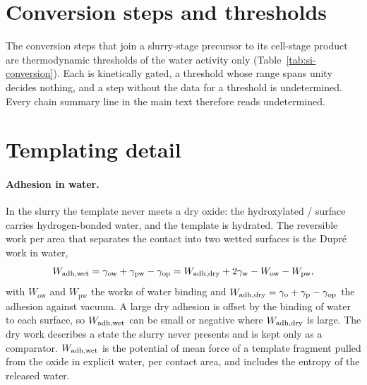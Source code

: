 \section{Conversion steps and thresholds}\label{si:conversion}
The conversion steps that join a slurry-stage precursor to its cell-stage product are thermodynamic thresholds of the water activity only (Table~\ref{tab:si-conversion}). %
Each is kinetically gated, a threshold whose range spans unity decides nothing, and a step without the data for a threshold is undetermined. %
Every chain summary line in the main text therefore reads undetermined. %
\begin{table}[t]
\caption{Conversion steps between the slurry and cell stages, from the onset ladder: the threshold water activity $a_\mathrm{w}^{*}$ of each dehydration or condensation step with its range, or the missing datum that leaves the step undetermined. Thresholds only; no conversion temperature is used.}\label{tab:si-conversion}
\nacreConversionTable
\end{table}

\section{Templating detail}\label{si:templating}
\paragraph*{Adhesion in water.}
In the slurry the template never meets a dry oxide: the hydroxylated / surface carries hydrogen-bonded water, and the template is hydrated. %
The reversible work per area that separates the contact into two wetted surfaces is the Dupr\'e work in water, %
\begin{equation}\label{eq:dupre}
W_\mathrm{adh,wet}=\gamma_\mathrm{ow}+\gamma_\mathrm{pw}-\gamma_\mathrm{op}=W_\mathrm{adh,dry}+2\gamma_\mathrm{w}-W_\mathrm{ow}-W_\mathrm{pw},
\end{equation}
with $W_\mathrm{ow}$ and $W_\mathrm{pw}$ the works of water binding and $W_\mathrm{adh,dry}=\gamma_\mathrm{o}+\gamma_\mathrm{p}-\gamma_\mathrm{op}$ the adhesion against vacuum. %
A large dry adhesion is offset by the binding of water to each surface, so $W_\mathrm{adh,wet}$ can be small or negative where $W_\mathrm{adh,dry}$ is large. %
The dry work describes a state the slurry never presents and is kept only as a comparator. %
$W_\mathrm{adh,wet}$ is the potential of mean force of a template fragment pulled from the oxide in explicit water, per contact area, and includes the entropy of the released water. %
